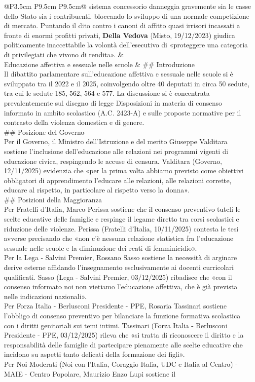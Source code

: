 \documentclass[a4paper,11pt]{article}
\begin{document}
\begin{landscape}
\begin{longtable}{@{}P{3.5cm} P{9.5cm} P{9.5cm}@{}}
sistema concessorio danneggia gravemente sia le casse dello Stato sia i contribuenti, bloccando lo sviluppo di una normale competizione di mercato. Puntando il dito contro i canoni di affitto quasi irrisori incassati a fronte di enormi profitti privati, \textbf{Della Vedova} (Misto, 19/12/2023) giudica politicamente inaccettabile la volontà dell'esecutivo di «proteggere una categoria di privilegiati che vivono di rendita». & \\
\midrule
Educazione affettiva e sessuale nelle scuole & \#\# Introduzione\\[6pt] Il dibattito parlamentare sull'educazione affettiva e sessuale nelle scuole si è sviluppato tra il 2022 e il 2025, coinvolgendo oltre 40 deputati in circa 50 sedute, tra cui le sedute 185, 562, 564 e 577. La discussione si è concentrata prevalentemente sul disegno di legge Disposizioni in materia di consenso informato in ambito scolastico (A.C. 2423-A) e sulle proposte normative per il contrasto della violenza domestica e di genere.\\[6pt] \#\# Posizione del Governo\\[6pt] Per il Governo, il Ministro dell'Istruzione e del merito Giuseppe Valditara sostiene l'inclusione dell'educazione alle relazioni nei programmi vigenti di educazione civica, respingendo le accuse di censura. Valditara (Governo, 12/11/2025) evidenzia che «per la prima volta abbiamo previsto come obiettivi obbligatori di apprendimento l'educare alle relazioni, alle relazioni corrette, educare al rispetto, in particolare al rispetto verso la donna».\\[6pt] \#\# Posizioni della Maggioranza\\[6pt] Per Fratelli d'Italia, Marco Perissa sostiene che il consenso preventivo tuteli le scelte educative delle famiglie e respinge il legame diretto tra corsi scolastici e riduzione delle violenze. Perissa (Fratelli d'Italia, 10/11/2025) contesta le tesi avverse precisando che «non c'è nessuna relazione statistica fra l'educazione sessuale nelle scuole e la diminuzione dei reati di femminicidio».\\[6pt] Per la Lega - Salvini Premier, Rossano Sasso sostiene la necessità di arginare derive esterne affidando l'insegnamento esclusivamente ai docenti curricolari qualificati. Sasso (Lega - Salvini Premier, 03/12/2025) ribadisce che «con il consenso informato noi non vietiamo l'educazione affettiva, che è già prevista nelle indicazioni nazionali».\\[6pt] Per Forza Italia - Berlusconi Presidente - PPE, Rosaria Tassinari sostiene l'obbligo di consenso preventivo per bilanciare la funzione formativa scolastica con i diritti genitoriali sui temi intimi. Tassinari (Forza Italia - Berlusconi Presidente - PPE, 03/12/2025) rileva che «si tratta di riconoscere il diritto e la responsabilità delle famiglie di partecipare pienamente alle scelte educative che incidono su aspetti tanto delicati della formazione dei figli».\\[6pt] Per Noi Moderati (Noi con l'Italia, Coraggio Italia, UDC e Italia al Centro) - MAIE - Centro Popolare, Maurizio Enzo Lupi sostiene il 
\end{longtable}
\end{landscape}
\end{document}
